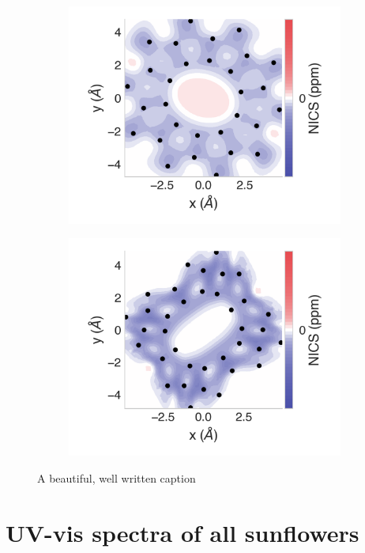 \documentclass[
	fontsize=10pt, %
	twoside=true, %
	numbers=noenddot, %
]{kaobook}
\begin{document}
\begin{figure}[h]
\begin{subfigure}{5.5cm}\centering\includegraphics{pn10-2d}\end{subfigure}%
\begin{subfigure}{5.5cm}\centering\includegraphics{pn12-2d}\end{subfigure}
\caption[short]{A beautiful, well written caption}
\end{figure}

\newpage
\section{UV-vis spectra of all sunflowers}
\end{document}

